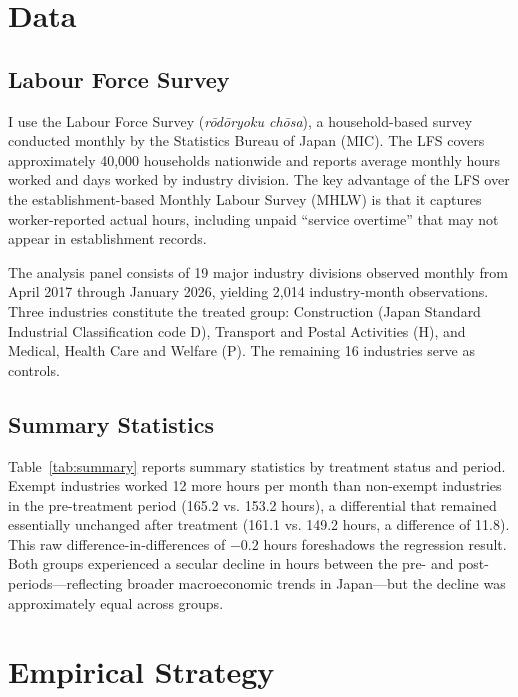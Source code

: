 \documentclass[12pt]{article}
\begin{document}
\section{Data}

\subsection{Labour Force Survey}

I use the Labour Force Survey (\textit{r\=od\=oryoku ch\=osa}), a household-based survey conducted monthly by the Statistics Bureau of Japan (MIC). The LFS covers approximately 40,000 households nationwide and reports average monthly hours worked and days worked by industry division. The key advantage of the LFS over the establishment-based Monthly Labour Survey (MHLW) is that it captures worker-reported actual hours, including unpaid ``service overtime'' that may not appear in establishment records.

The analysis panel consists of 19 major industry divisions observed monthly from April 2017 through January 2026, yielding 2,014 industry-month observations. Three industries constitute the treated group: Construction (Japan Standard Industrial Classification code D), Transport and Postal Activities (H), and Medical, Health Care and Welfare (P). The remaining 16 industries serve as controls.

\subsection{Summary Statistics}



Table~\ref{tab:summary} reports summary statistics by treatment status and period. Exempt industries worked 12 more hours per month than non-exempt industries in the pre-treatment period (165.2 vs. 153.2 hours), a differential that remained essentially unchanged after treatment (161.1 vs. 149.2 hours, a difference of 11.8). This raw difference-in-differences of $-0.2$ hours foreshadows the regression result. Both groups experienced a secular decline in hours between the pre- and post-periods---reflecting broader macroeconomic trends in Japan---but the decline was approximately equal across groups.

\section{Empirical Strategy}
\end{document}
